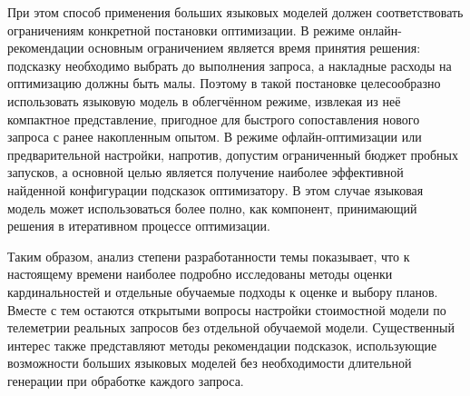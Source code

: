 При этом способ применения больших языковых моделей должен соответствовать ограничениям конкретной постановки оптимизации. В режиме онлайн-рекомендации основным ограничением является время принятия решения: подсказку необходимо выбрать до выполнения запроса, а накладные расходы на оптимизацию должны быть малы. Поэтому в такой постановке целесообразно использовать языковую модель в облегчённом режиме, извлекая из неё компактное представление, пригодное для быстрого сопоставления нового запроса с ранее накопленным опытом. В режиме офлайн-оптимизации или предварительной настройки, напротив, допустим ограниченный бюджет пробных запусков, а основной целью является получение наиболее эффективной найденной конфигурации подсказок оптимизатору. В этом случае языковая модель может использоваться более полно, как компонент, принимающий решения в итеративном процессе оптимизации.



Таким образом, анализ степени разработанности темы показывает, что к настоящему времени наиболее подробно исследованы методы оценки кардинальностей и отдельные обучаемые подходы к оценке и выбору планов. Вместе с тем остаются открытыми вопросы настройки стоимостной модели по телеметрии реальных запросов без отдельной обучаемой модели. Существенный интерес также представляют методы рекомендации подсказок, использующие возможности больших языковых моделей без необходимости длительной генерации при обработке каждого запроса. 


